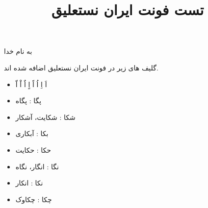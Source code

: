 \documentclass[14pt,a4paper]{article}
\begin{document}
\title{تست فونت ایران نستعلیق}
\author{ }
\date{ }
\maketitle


\begin{center}
به نام خدا
\end{center}

گلیف های زیر در فونت ایران نستعلیق اضافه شده اند.

\begin{itemize}
\item
اَ اِ اُ اً اٍ اٌ اْ اّ
\item 
پگا : پگاه
\item 
شکا : شکایت، آشکار
\item
بکا : آبکاری
\item
حکا : حکایت
\item
نگا : انگار، نگاه
\item
نکا : انکار
\item
چکا : چکاوک
\end{itemize}
\end{document}
